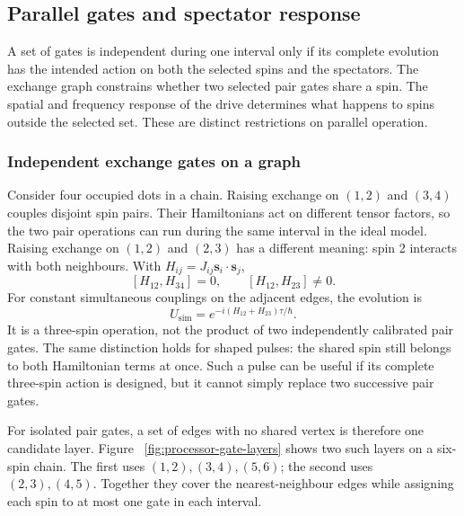 \subsection{Parallel gates and spectator response}
\label{sec:addressing-parallel-operation}

A set of gates is independent during one interval only if its
complete evolution has the intended action on both the selected
spins and the spectators. The exchange graph constrains whether
two selected pair gates share a spin. The spatial and frequency
response of the drive determines what happens to spins outside
the selected set. These are distinct restrictions on parallel
operation.

\subsubsection{Independent exchange gates on a graph}
\label{sec:processor-parallel-exchange}

Consider four occupied dots in a chain. Raising exchange on
\((1,2)\) and \((3,4)\) couples disjoint spin pairs. Their
Hamiltonians act on different tensor factors, so the two
pair operations can run during the same interval in the ideal
model. Raising exchange on \((1,2)\) and \((2,3)\) has a
different meaning: spin 2 interacts with both neighbours.
With \(H_{ij}=J_{ij}\mathbf s_i\cdot\mathbf s_j\),
\[
 [H_{12},H_{34}]=0,\qquad [H_{12},H_{23}]\ne0.
\]
For constant simultaneous couplings on the adjacent edges,
the evolution is
\[
 U_{\mathrm{sim}}
 =e^{-i(H_{12}+H_{23})\tau/\hbar}.
\]
It is a three-spin operation, not the product of two
independently calibrated pair gates. The same distinction
holds for shaped pulses: the shared spin still belongs to
both Hamiltonian terms at once. Such a pulse can be useful
if its complete three-spin action is designed, but it
cannot simply replace two successive pair gates.

For isolated pair gates, a set of edges with no shared
vertex is therefore one candidate layer. Figure~
\ref{fig:processor-gate-layers} shows two such layers on a
six-spin chain. The first uses \((1,2),(3,4),(5,6)\);
the second uses \((2,3),(4,5)\). Together they cover
the nearest-neighbour edges while assigning each spin
to at most one gate in each interval.

